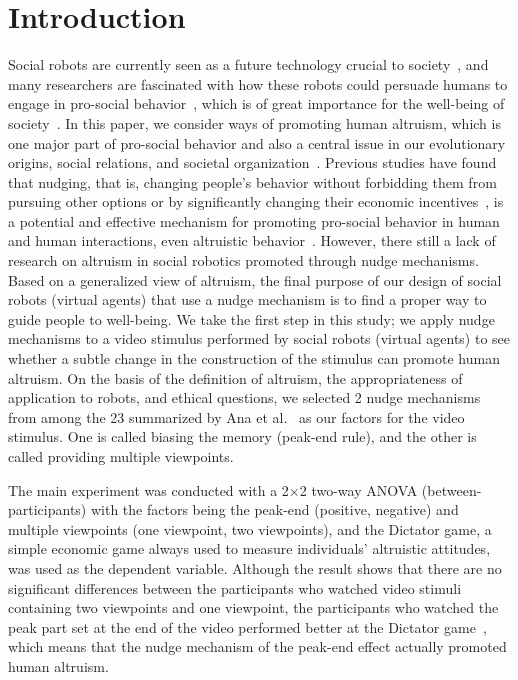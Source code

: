 \documentclass[runningheads]{llncs}
\begin{document}
\section{Introduction}
Social robots are currently seen as a future technology crucial to society~\cite{ref_article26}, and many researchers are fascinated with how these robots could persuade humans to engage in pro-social behavior~\cite{ref_article27,ref_article28,ref_article29,ref_article30,ref_article31}, which is of great importance for the well-being of society~\cite{ref_article34}. In this paper, we consider ways of promoting human altruism, which is one major part of pro-social behavior and also a central issue in our evolutionary origins, social relations, and societal organization~\cite{ref_article1}. Previous studies have found that nudging, that is, changing people's behavior without forbidding them from pursuing other options or by significantly changing their economic incentives~\cite{ref_book2}, is a potential and effective mechanism for promoting pro-social behavior in human and human interactions, even altruistic behavior~\cite{ref_article2,ref_article3}. However, there still a lack of research on altruism in social robotics promoted through nudge mechanisms. Based on a generalized view of altruism, the final purpose of our design of social robots (virtual agents) that use a nudge mechanism is to find a proper way to guide people to well-being. We take the first step in this study; we apply nudge mechanisms to a video stimulus performed by social robots (virtual agents) to see whether a subtle change in the construction of the stimulus can promote human altruism. On the basis of the definition of altruism, the appropriateness of application to robots, and ethical questions, we selected 2 nudge mechanisms from among the 23 summarized by Ana et al.~\cite{ref_article5} as our factors for the video stimulus. One is called biasing the memory (peak-end rule), and the other is called providing multiple viewpoints. 

The main experiment was conducted with a 2×2 two-way ANOVA (between-participants) with the factors being the peak-end (positive, negative) and multiple viewpoints (one viewpoint, two viewpoints), and the Dictator game, a simple economic game always used to measure individuals' altruistic attitudes, was used as the dependent variable. Although the result shows that there are no significant differences between the participants who watched video stimuli containing two viewpoints and one viewpoint, the participants who watched the peak part set at the end of the video performed better at the Dictator game~\cite{ref_article36}, which means that the nudge mechanism of the peak-end effect actually promoted human altruism.
\end{document}
